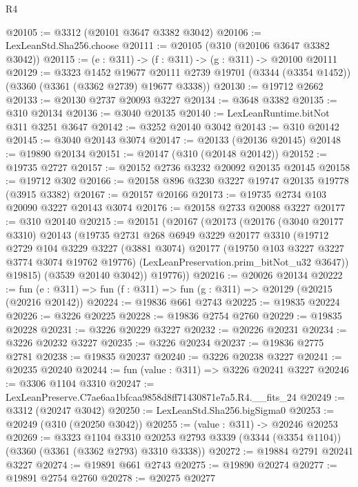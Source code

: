 \begin{lexlean}{R4}
\begin{coremodule}
@20105 := @3312 (@20101 @3647 @3382 @3042)
@20106 := LexLeanStd.Sha256.choose
@20111 := @20105 (@310 (@20106 @3647 @3382 @3042))
@20115 := (e : @311) -> (f : @311) -> (g : @311) -> @20100 @20111
@20129 := @3323
    @1452
    @19677
    @20111
    @2739
    @19701
    (@3344 (@3354 @1452))
    (@3360 (@3361 (@3362 @2739) @19677 @3338))
@20130 := @19712 @2662
@20133 := @20130 @2737 @20093 @3227
@20134 := @3648 @3382
@20135 := @310 @20134
@20136 := @3040 @20135
@20140 := LexLeanRuntime.bitNot @311 @3251 @3647
@20142 := @3252 @20140 @3042
@20143 := @310 @20142
@20145 := @3040 @20143 @3074
@20147 := @20133 (@20136 @20145)
@20148 := @19890 @20134
@20151 := @20147 (@310 (@20148 @20142))
@20152 := @19735 @2727
@20157 := @20152 @2736 @3232 @20092 @20135 @20145
@20158 := @19712 @302
@20166 := @20158 @896 @3230 @3227 @19747 @20135 @19778 (@3915 @3382)
@20167 := @20157 @20166
@20173 := @19735 @2734 @103 @20090 @3227 @20143 @3074
@20176 := @20158 @2733 @20088 @3227
@20177 := @310 @20140
@20215 := @20151
    (@20167
      (@20173
        (@20176
          (@3040 @20177 @3310)
          @20143
          (@19735
            @2731
            @268
            @6949
            @3229
            @20177
            @3310
            (@19712
              @2729
              @104
              @3229
              @3227
              (@3881 @3074)
              @20177
              (@19750 @103 @3227 @3227 @3774 @3074 @19762 @19776)
              (LexLeanPreservation.prim_bitNot_u32 @3647))
            @19815)
          (@3539 @20140 @3042))
        @19776))
@20216 := @20026 @20134
@20222 := fun (e : @311) => fun (f : @311) => fun (g : @311) => @20129 (@20215 (@20216 @20142))
@20224 := @19836 @661 @2743
@20225 := @19835 @20224
@20226 := @3226 @20225
@20228 := @19836 @2754 @2760
@20229 := @19835 @20228
@20231 := @3226 @20229 @3227
@20232 := @20226 @20231
@20234 := @3226 @20232 @3227
@20235 := @3226 @20234
@20237 := @19836 @2775 @2781
@20238 := @19835 @20237
@20240 := @3226 @20238 @3227
@20241 := @20235 @20240
@20244 := fun (value : @311) => @3226 @20241 @3227
@20246 := @3306 @1104 @3310
@20247 := LexLeanPreserve.C7ae6aa1bfcaa9858d8ff71430871e7a5.R4.__fits_24
@20249 := @3312 (@20247 @3042)
@20250 := LexLeanStd.Sha256.bigSigma0
@20253 := @20249 (@310 (@20250 @3042))
@20255 := (value : @311) -> @20246 @20253
@20269 := @3323
    @1104
    @3310
    @20253
    @2793
    @3339
    (@3344 (@3354 @1104))
    (@3360 (@3361 (@3362 @2793) @3310 @3338))
@20272 := @19884 @2791 @20241 @3227
@20274 := @19891 @661 @2743
@20275 := @19890 @20274
@20277 := @19891 @2754 @2760
@20278 := @20275 @20277

\end{coremodule}
\end{lexlean}
